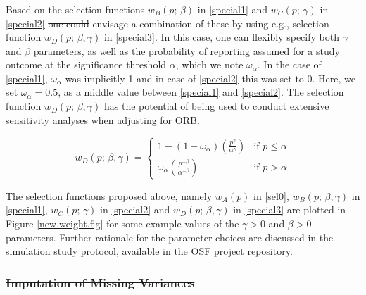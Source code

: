 \documentclass[twocolumn]{article}\usepackage[]{graphicx}\usepackage[]{xcolor}
\providecommand{\DIFaddtex}[1]{{\protect\color{blue}\uwave{#1}}} %
\providecommand{\DIFdeltex}[1]{{\protect\color{red}\sout{#1}}}                      %
\providecommand{\DIFaddbegin}{} %
\providecommand{\DIFaddend}{} %
\providecommand{\DIFdelbegin}{} %
\providecommand{\DIFdelend}{} %
\providecommand{\DIFadd}[1]{\texorpdfstring{\DIFaddtex{#1}}{#1}} %
\providecommand{\DIFdel}[1]{\texorpdfstring{\DIFdeltex{#1}}{}} %
\newcommand{\DIFscaledelfig}{0.5}
\newlength{\DIFdelgraphicswidth} %
\newlength{\DIFdelgraphicsheight} %
\newcommand{\DIFaddincludegraphics}[2][]{{\color{blue}\fbox{\DIFOincludegraphics[#1]{#2}}}} %
\newcommand{\DIFdelincludegraphics}[2][]{%
\sbox{\DIFdelgraphicsbox}{\DIFOincludegraphics[#1]{#2}}%
\settoboxwidth{\DIFdelgraphicswidth}{\DIFdelgraphicsbox} %
\settoboxtotalheight{\DIFdelgraphicsheight}{\DIFdelgraphicsbox} %
\scalebox{\DIFscaledelfig}{%
\parbox[b]{\DIFdelgraphicswidth}{\usebox{\DIFdelgraphicsbox}\\[-\baselineskip] \rule{\DIFdelgraphicswidth}{0em}}\llap{\resizebox{\DIFdelgraphicswidth}{\DIFdelgraphicsheight}{%
\setlength{\unitlength}{\DIFdelgraphicswidth}%
\begin{picture}(1,1)%
\thicklines\linethickness{2pt} %
{\color[rgb]{1,0,0}\put(0,0){\framebox(1,1){}}}%
{\color[rgb]{1,0,0}\put(0,0){\line( 1,1){1}}}%
{\color[rgb]{1,0,0}\put(0,1){\line(1,-1){1}}}%
\end{picture}%
}\hspace*{3pt}}} %
} %
\DeclareRobustCommand{\DIFaddbegin}{\DIFOaddbegin \let\includegraphics\DIFaddincludegraphics} %
\DeclareRobustCommand{\DIFaddend}{\DIFOaddend \let\includegraphics\DIFOincludegraphics} %
\DeclareRobustCommand{\DIFdelbegin}{\DIFOdelbegin \let\includegraphics\DIFdelincludegraphics} %
\DeclareRobustCommand{\DIFdelend}{\DIFOaddend \let\includegraphics\DIFOincludegraphics} %
\begin{document}
\bigskip

\DIFaddbegin \subsubsection{\DIFadd{Piecewise decreasing}}

\DIFaddend Based on the selection functions $w_B(p \text{; } \beta)$ in \eqref{special1} and $w_C(p \text{; } \gamma)$ in \eqref{special2} \DIFdelbegin \DIFdel{one could }\DIFdelend \DIFaddbegin \DIFadd{we  }\DIFaddend envisage a combination of these by using e.g., selection function $w_D(p \text{; } \beta, \gamma)$ in \eqref{special3}. In this case, one can flexibly specify both $\gamma$ and $\beta$ parameters, as well as the probability of reporting assumed for a study outcome at the significance threshold $\alpha$, which we note $\omega_{\alpha}$. In the case of \eqref{special1}, $\omega_{\alpha}$ was implicitly 1 and in case of \eqref{special2} this was set to 0. Here, we set $\omega_{\alpha}=0.5$, as a middle value between \eqref{special1} and \eqref{special2}. The selection function $w_D(p \text{; } \beta, \gamma)$ has the potential of being used to conduct extensive sensitivity analyses when adjusting for ORB.

\bigskip

\begin{equation}
w_D(p \text{; } \beta, \gamma) = 
\begin{cases}
1 - (1-\omega_{\alpha})\left(\frac{p^{\gamma}}{\alpha^{\gamma}}\right) & \text{if } p \leq \alpha \\
\omega_{\alpha}\left(\frac{p^{-\beta}}{\alpha^{-\beta}}\right) & \text{if } p > \alpha
\end{cases}
\label{special3}
\end{equation}

\bigskip

The selection functions proposed above, namely $w_A(p)$ in \eqref{sel0}, $w_B(p \text{; } \beta, \gamma)$ in \eqref{special1}, $w_C(p \text{; } \gamma)$ in \eqref{special2} and $w_D(p \text{; } \beta, \gamma)$ in \eqref{special3} are plotted in Figure \ref{new.weight.fig} for some example values of the $\gamma > 0$ and $\beta > 0$ parameters. Further rationale for the parameter choices are discussed in the simulation study protocol, available in the \href{https://osf.io/ancdu/}{OSF project repository}.

\DIFdelbegin \subsubsection{\DIFdel{Imputation of Missing Variances}} %
\addtocounter{subsubsection}{-1}%
\end{document}
